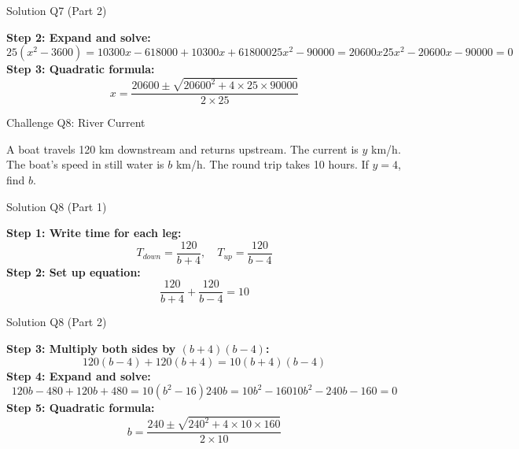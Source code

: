 \documentclass[aspectratio=169]{beamer}
\begin{document}
\begin{frame}{Solution Q7 (Part 2)}
\begin{tcolorbox}[colback=lightgray,colframe=accent,title=Solution Q7 (Part 2)]
\footnotesize
\textbf{Step 2: Expand and solve:}
\[
25(x^2-3600) = 10300x - 618000 + 10300x + 618000
25x^2 - 90000 = 20600x
25x^2 - 20600x - 90000 = 0
\]
\textbf{Step 3: Quadratic formula:}
\[
x = \frac{20600 \pm \sqrt{20600^2 + 4 \times 25 \times 90000}}{2 \times 25}
\]
\end{tcolorbox}
\end{frame}

\begin{frame}{Challenge Q8: River Current}
\begin{tcolorbox}[colback=lightgray,colframe=primary,title=Challenge Q8]
\footnotesize
A boat travels 120 km downstream and returns upstream. The current is $y$ km/h. The boat's speed in still water is $b$ km/h. The round trip takes 10 hours. If $y=4$, find $b$.
\end{tcolorbox}
\end{frame}

\begin{frame}{Solution Q8 (Part 1)}
\begin{tcolorbox}[colback=lightgray,colframe=accent,title=Solution Q8 (Part 1)]
\footnotesize
\textbf{Step 1: Write time for each leg:}
\[
T_{down} = \frac{120}{b+4},\quad T_{up} = \frac{120}{b-4}
\]
\textbf{Step 2: Set up equation:}
\[
\frac{120}{b+4} + \frac{120}{b-4} = 10
\]
\end{tcolorbox}
\end{frame}

\begin{frame}{Solution Q8 (Part 2)}
\begin{tcolorbox}[colback=lightgray,colframe=accent,title=Solution Q8 (Part 2)]
\footnotesize
\textbf{Step 3: Multiply both sides by $(b+4)(b-4)$:}
\[
120(b-4) + 120(b+4) = 10(b+4)(b-4)
\]
\textbf{Step 4: Expand and solve:}
\[
120b - 480 + 120b + 480 = 10(b^2-16)
240b = 10b^2 - 160
10b^2 - 240b - 160 = 0
\]
\textbf{Step 5: Quadratic formula:}
\[
b = \frac{240 \pm \sqrt{240^2 + 4 \times 10 \times 160}}{2 \times 10}
\]
\end{tcolorbox}
\end{frame}
\end{document}
